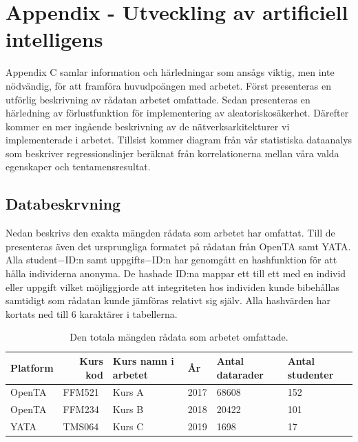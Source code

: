 \chapter{Appendix - Utveckling av artificiell intelligens}

Appendix C samlar information och härledningar som ansågs viktig, men inte nödvändig, för att framföra huvudpoängen med arbetet. Först presenteras en utförlig beskrivning av rådatan arbetet omfattade. Sedan presenteras en härledning av förlustfunktion för implementering av aleatoriskosäkerhet. Därefter kommer en mer ingående beskrivning av de nätverksarkitekturer vi implementerade i arbetet. Tillsist kommer diagram från vår statistiska dataanalys som beskriver regressionslinjer beräknat från korrelationerna mellan våra valda egenskaper och tentamensresultat.

\section{Databeskrvning}
\label{app: dataDescription}

Nedan beskrivs den exakta mängden rådata som arbetet har omfattat. Till de presenteras även det ursprungliga formatet på rådatan från OpenTA samt YATA. Alla student$-$ID:n samt uppgifts$-$ID:n har genomgått en hashfunktion för att hålla individerna anonyma. De hashade ID:na mappar ett till ett med en individ eller uppgift vilket möjliggjorde att integriteten hos individen kunde bibehållas samtidigt som rådatan kunde jämföras relativt sig själv. Alla hashvärden har kortats ned till 6 karaktärer i tabellerna.


\begin{table}[hbtp]
\begin{tabular}{|l|l|l|l|l|l|}
\hline
\textbf{Platform} & \multicolumn{1}{r|}{\textbf{Kurs kod}} & \textbf{Kurs namn i arbetet} & \textbf{År}   & \textbf{Antal datarader} & \textbf{Antal studenter} \\ \hline
OpenTA   & FFM521                        & Kurs A             & 2017 & 68608           & 152             \\ \hline
OpenTA   & FFM234                        & Kurs B             & 2018 & 20422           & 101             \\ \hline
YATA     & TMS064                        & Kurs C             & 2019 & 1698             & 17              \\ \hline
\end{tabular}
\caption{Den totala mängden rådata som arbetet omfattade.}
\end{table}

